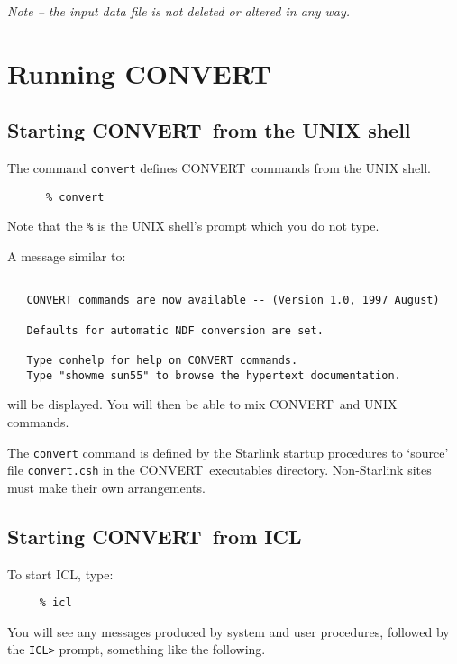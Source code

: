 \documentclass[twoside,11pt]{article}
\newcommand{\xref}[3]{#1}
\newcommand{\xlabel}[1]{}
\newcommand{\CONVERT}{{\footnotesize CONVERT}}
\newcommand{\BCONVERT}{{\normalsize CONVERT}}
\newcommand{\ICL}{{\footnotesize ICL}}
\newcommand{\ICLref}{\xref{\ICL}{sg5}{}}
\begin{document}
{\sl Note -- the input data file is not deleted or altered in any way.}

\newpage 
\section[Running {\small \bf CONVERT}]{\label{running_convert}Running \BCONVERT}

\subsection[Starting {\small CONVERT} from the UNIX shell]
{\xlabel{starting_convert_from_the_unix_shell}
Starting \BCONVERT\ from the UNIX shell}

The command \texttt{convert} defines \CONVERT\ commands from
the UNIX shell.

\small
\begin{verbatim}
      % convert
\end{verbatim}
\normalsize 
Note that the \texttt{\%} is the UNIX shell's prompt which you do not type.

A message similar to:
\small
\begin{verbatim}

   CONVERT commands are now available -- (Version 1.0, 1997 August)

   Defaults for automatic NDF conversion are set.

   Type conhelp for help on CONVERT commands.
   Type "showme sun55" to browse the hypertext documentation.

\end{verbatim}
\normalsize 
will be displayed. You will then be able to mix \CONVERT\ and UNIX commands.

The \texttt{convert} command is defined by the Starlink startup procedures to
`source' file \texttt{convert.csh} in the \CONVERT\ executables directory. 
Non-Starlink sites must make their own arrangements.

\subsection[Starting {\small CONVERT} from {\small \bf ICL}]
{\xlabel{starting_convert_from_icl}
Starting \BCONVERT\ from ICL}
To start \ICLref, type:
\small
\begin{verbatim}
     % icl
\end{verbatim}
\normalsize
You will see any messages produced by system and user procedures, followed
by the \texttt{ICL>} prompt, something like the following.
\end{document}

